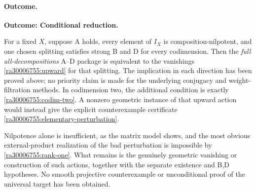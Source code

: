\documentclass[11pt]{article}
\begin{document}
\paragraph{Outcome.}
\textbf{Outcome: Conditional reduction.}

For a fixed $X$, suppose A holds, every element of $I_X$ is composition-nilpotent,
and one chosen splitting satisfies strong B and D for every codimension.
Then the \emph{full all-decompositions} A--D package is equivalent to the
vanishings \eqref{ra30006755:upward} for that splitting.  The implication in each
direction has been proved above; no priority claim is made for the underlying
conjugacy and weight-filtration methods.  In codimension two, the additional
condition is exactly \eqref{ra30006755:codim-two}.  A nonzero geometric instance of
that upward action would instead give the explicit counterexample certificate
\eqref{ra30006755:elementary-perturbation}.

Nilpotence alone is insufficient, as the matrix model shows, and the most
obvious external-product realization of the bad perturbation is impossible
by \eqref{ra30006755:rank-one}.  What remains is the genuinely geometric vanishing
or construction of such actions, together with the separate existence and
B,D hypotheses.  No smooth projective counterexample or unconditional proof
of the universal target has been obtained.
\end{document}
